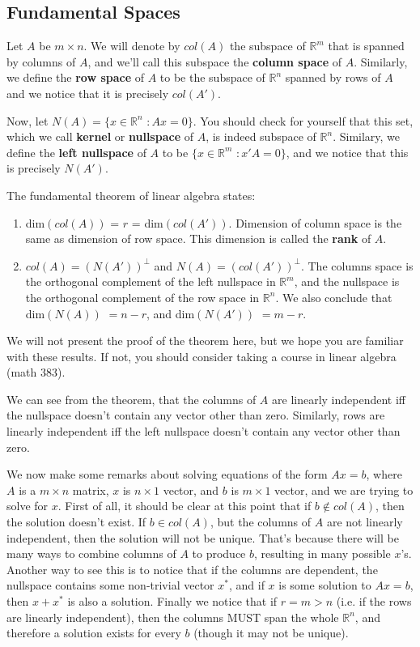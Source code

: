 \documentclass[12pt,oneside]{article}
\begin{document}
\subsection{Fundamental Spaces}
Let $A$ be $m \times n$. We will denote by $col(A)$ the subspace of
${\mathbb{R}}^m$ that is spanned by columns of $A$, and we'll call
this subspace the \textbf{column space} of $A$. Similarly, we define the
\textbf{row space} of $A$ to be the subspace of ${\mathbb{R}}^n$
spanned by rows of $A$ and we notice that it is precisely
$col(A')$.

Now, let $N(A) = \{x \in {\mathbb{R}}^n$ $: Ax = 0\}$. You should
check for yourself that this set, which we call \textbf{kernel} or
\textbf{nullspace} of $A$, is indeed subspace of
${\mathbb{R}}^n$. Similary, we define the \textbf{left nullspace} of
$A$ to be $\{x \in {\mathbb{R}}^m$ $: x'A = 0\}$, and we notice that
this is precisely $N(A')$.

The fundamental theorem of linear algebra states:
\begin{enumerate}
\item dim$(col(A))$ = $r$ = dim$(col(A'))$. Dimension of column space
  is the same as dimension of row space. This dimension is called the
  \textbf{rank} of $A$.
\item $col(A) = {(N(A'))}^\perp$ and $N(A) = {(col(A'))}^\perp$. The
  columns space is the orthogonal complement of the left nullspace in
  ${\mathbb{R}}^m$, and the nullspace is the orthogonal complement of
  the row space in ${\mathbb{R}}^n$. We also conclude that dim$(N(A))$
  $= n - r$, and dim$(N(A'))$ $= m - r$.
\end{enumerate}
We will not present the proof of the theorem here, but we hope you are
familiar with these results. If not, you should consider taking a
course in linear algebra (math 383).

We can see from the theorem, that the columns of $A$ are linearly
independent iff the nullspace doesn't contain any vector other than
zero. Similarly, rows are linearly independent iff the left nullspace
doesn't contain any vector other than zero.

We now make some remarks about solving equations of the form $Ax = b$,
where $A$ is a $m \times n$ matrix, $x$ is $n \times 1$ vector, and
$b$ is $m \times 1$ vector, and we are trying to solve for $x$. First
of all, it should be clear at this point that if $b \notin col(A)$,
then the solution doesn't exist. If $b \in col(A)$, but the columns of
$A$ are not linearly independent, then the solution will not be
unique. That's because there will be many ways to combine columns of
$A$ to produce $b$, resulting in many possible $x$'s. Another way to
see this is to notice that if the columns are dependent, the nullspace
contains some non-trivial vector $x^*$, and if $x$ is some solution to
$Ax = b$, then $x + x^*$ is also a solution. Finally we notice that if
$r = m > n$ (i.e. if the rows are linearly independent), then the
columns MUST span the whole ${\mathbb{R}}^n$, and therefore a solution
exists for every $b$ (though it may not be unique).
\end{document}
